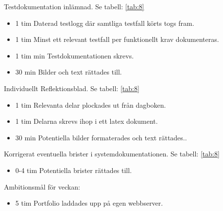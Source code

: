 \documentclass{TDP003mall}
\begin{document}
Testdokumentation inlämnad. Se tabell: \ref{tab:8}
\begin{itemize}
  \item 1 tim Daterad testlogg där samtliga testfall körts togs fram.
  \item 1 tim Minst ett relevant testfall per funktionellt krav dokumenteras.
  \item 1 tim min Testdokumentationen skrevs.
  \item 30 min Bilder och text rättades till.
\end{itemize}

Individuellt Reflektionsblad. Se tabell: \ref{tab:8}
\begin{itemize}
\item 1 tim Relevanta delar plockades ut från dagboken.
  \item 1 tim Delarna skrevs ihop i ett latex dokument.
  \item 30 min Potentiella bilder formaterades och text rättades..
\end{itemize}
  
  Korrigerat eventuella brister i systemdokumentationen. Se tabell: \ref{tab:8}
\begin{itemize}
  \item 0-4 tim Potentiella brister rättades till.
\end{itemize}

Ambitionsmål för veckan:
\begin{itemize}
  \item 5 tim Portfolio laddades upp på egen webbserver.
\end{itemize}
\end{document}

